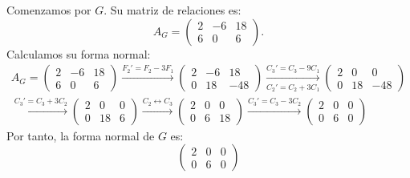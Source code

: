 \begin{ejercicio}
\begin{enumerate}
        Comenzamos por $G$. Su matriz de relaciones es:
        \begin{equation*}
            A_G = \begin{pmatrix}
                2 & -6 & 18 \\
                6 & 0 & 6
            \end{pmatrix}.
        \end{equation*}
        Calculamos su forma normal:
        \begin{multline*}
            A_G = \begin{pmatrix}
                2 & -6 & 18 \\
                6 & 0 & 6
            \end{pmatrix}
            \xrightarrow{F_2'=F_2-3F_1}
            \begin{pmatrix}
                2 & -6 & 18 \\
                0 & 18 & -48
            \end{pmatrix}
            \xrightarrow[C_2'=C_2+3C_1]{C_3'=C_3-9C_1}
            \begin{pmatrix}
                2 & 0 & 0 \\
                0 & 18 & -48
            \end{pmatrix}\\
            \xrightarrow{C_3'=C_3+3C_2}
            \begin{pmatrix}
                2 & 0 & 0 \\
                0 & 18 & 6
            \end{pmatrix}
            \xrightarrow{C_2\leftrightarrow C_3}
            \begin{pmatrix}
                2 & 0 & 0 \\
                0 & 6 & 18
            \end{pmatrix}
            \xrightarrow{C_3'=C_3-3C_2}
            \begin{pmatrix}
                2 & 0 & 0 \\
                0 & 6 & 0
            \end{pmatrix}
        \end{multline*}
        Por tanto, la forma normal de $G$ es:
        \begin{equation*}
            \begin{pmatrix}
                2 & 0 & 0 \\
                0 & 6 & 0
            \end{pmatrix}
        \end{equation*}

\end{enumerate}
\end{ejercicio}
